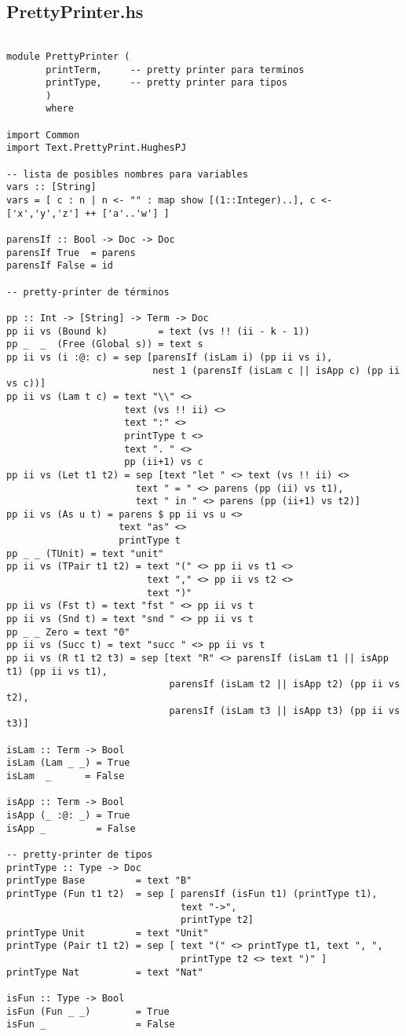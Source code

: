 \documentclass[a4paper]{article}
\begin{document}
\subsection*{PrettyPrinter.hs}
\begin{lstlisting}

module PrettyPrinter (
       printTerm,     -- pretty printer para terminos
       printType,     -- pretty printer para tipos
       )
       where

import Common
import Text.PrettyPrint.HughesPJ

-- lista de posibles nombres para variables
vars :: [String]
vars = [ c : n | n <- "" : map show [(1::Integer)..], c <- ['x','y','z'] ++ ['a'..'w'] ]

parensIf :: Bool -> Doc -> Doc
parensIf True  = parens
parensIf False = id

-- pretty-printer de términos

pp :: Int -> [String] -> Term -> Doc
pp ii vs (Bound k)         = text (vs !! (ii - k - 1))
pp _  _  (Free (Global s)) = text s
pp ii vs (i :@: c) = sep [parensIf (isLam i) (pp ii vs i),
                          nest 1 (parensIf (isLam c || isApp c) (pp ii vs c))]
pp ii vs (Lam t c) = text "\\" <>
                     text (vs !! ii) <>
                     text ":" <>
                     printType t <>
                     text ". " <>
                     pp (ii+1) vs c
pp ii vs (Let t1 t2) = sep [text "let " <> text (vs !! ii) <>
                       text " = " <> parens (pp (ii) vs t1),
                       text " in " <> parens (pp (ii+1) vs t2)]
pp ii vs (As u t) = parens $ pp ii vs u <>
                    text "as" <>
                    printType t
pp _ _ (TUnit) = text "unit"
pp ii vs (TPair t1 t2) = text "(" <> pp ii vs t1 <>
                         text "," <> pp ii vs t2 <>
                         text ")"
pp ii vs (Fst t) = text "fst " <> pp ii vs t
pp ii vs (Snd t) = text "snd " <> pp ii vs t
pp _ _ Zero = text "0"
pp ii vs (Succ t) = text "succ " <> pp ii vs t
pp ii vs (R t1 t2 t3) = sep [text "R" <> parensIf (isLam t1 || isApp t1) (pp ii vs t1),
                             parensIf (isLam t2 || isApp t2) (pp ii vs t2),
                             parensIf (isLam t3 || isApp t3) (pp ii vs t3)]

isLam :: Term -> Bool
isLam (Lam _ _) = True
isLam  _      = False

isApp :: Term -> Bool
isApp (_ :@: _) = True
isApp _         = False

-- pretty-printer de tipos
printType :: Type -> Doc
printType Base         = text "B"
printType (Fun t1 t2)  = sep [ parensIf (isFun t1) (printType t1),
                               text "->",
                               printType t2]
printType Unit         = text "Unit"
printType (Pair t1 t2) = sep [ text "(" <> printType t1, text ", ",
                               printType t2 <> text ")" ]
printType Nat          = text "Nat"

isFun :: Type -> Bool
isFun (Fun _ _)        = True
isFun _                = False

\end{lstlisting}
\end{document}
